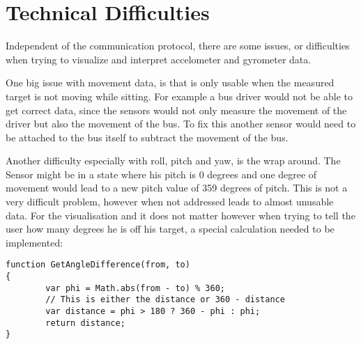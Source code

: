 \section{Technical Difficulties}

Independent of the communication protocol, there are some issues, or difficulties when trying to visualize and interpret accelometer and gyrometer data.  

One big issue with movement data, is that is only usable when the measured target is not moving while sitting. For example a bus driver would not be able to get correct data, since the sensors would not only measure the movement of the driver but also the movement of the bus. To fix this another sensor would need to be attached to the bus itself to subtract the movement of the bus. 

Another difficulty especially with roll, pitch and yaw, is the wrap around. The Sensor might be in a state where his pitch is 0 degrees and one degree of movement would lead to a new pitch value of 359 degrees of pitch. This is not a very difficult problem, however when not addressed leads to almost unusable data. 
For the visualisation and it does not matter however when trying to tell the user how many degrees he is off his target, a special calculation needed to be implemented:

\begin{lstlisting}
function GetAngleDifference(from, to)
{
        var phi = Math.abs(from - to) % 360;
        // This is either the distance or 360 - distance
        var distance = phi > 180 ? 360 - phi : phi;
        return distance;
}
\end{lstlisting}
